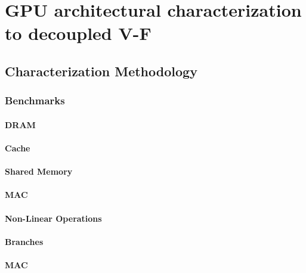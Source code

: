 
\chapter{GPU architectural characterization to decoupled V-F}
\label{chapter:gpu_char}

\section{Characterization Methodology}
\subsection{Benchmarks}
\subsubsection{DRAM}
\subsubsection{Cache}
\subsubsection{Shared Memory}
\subsubsection{MAC}
\subsubsection{Non-Linear Operations}
\subsubsection{Branches}
\subsubsection{MAC}

